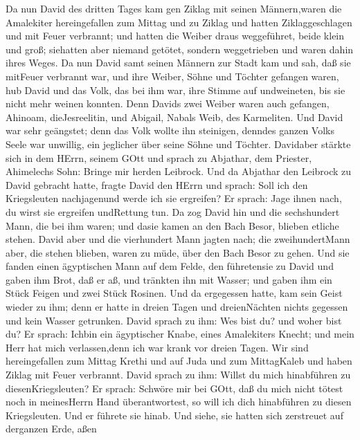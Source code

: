  Da nun David des dritten Tages kam gen Ziklag mit seinen
Männern,waren die Amalekiter hereingefallen zum Mittag und zu Ziklag und
hatten Ziklaggeschlagen und mit Feuer verbrannt;  und hatten
die Weiber draus weggeführet, beide klein und groß; siehatten aber
niemand getötet, sondern weggetrieben und waren dahin ihres Weges.
 Da nun David samt seinen Männern zur Stadt kam und sah, daß
sie mitFeuer verbrannt war, und ihre Weiber, Söhne und Töchter gefangen
waren,  hub David und das Volk, das bei ihm war, ihre Stimme
auf undweineten, bis sie nicht mehr weinen konnten.  Denn
Davids zwei Weiber waren auch gefangen, Ahinoam, dieJesreelitin, und
Abigail, Nabals Weib, des Karmeliten.  Und David war sehr
geängstet; denn das Volk wollte ihn steinigen, denndes ganzen Volks
Seele war unwillig, ein jeglicher über seine Söhne und Töchter.
Davidaber stärkte sich in dem HErrn, seinem GOtt  und sprach
zu Abjathar, dem Priester, Ahimelechs Sohn: Bringe mir herden Leibrock.
Und da Abjathar den Leibrock zu David gebracht hatte, 
fragte David den HErrn und sprach: Soll ich den Kriegsleuten
nachjagenund werde ich sie ergreifen? Er sprach: Jage ihnen nach, du
wirst sie ergreifen undRettung tun.  Da zog David hin und
die sechshundert Mann, die bei ihm waren; und dasie kamen an den Bach
Besor, blieben etliche stehen.  David aber und die
vierhundert Mann jagten nach; die zweihundertMann aber, die stehen
blieben, waren zu müde, über den Bach Besor zu gehen.  Und
sie fanden einen ägyptischen Mann auf dem Felde, den führetensie zu
David und gaben ihm Brot, daß er aß, und tränkten ihn mit Wasser;
 und gaben ihm ein Stück Feigen und zwei Stück Rosinen. Und
da ergegessen hatte, kam sein Geist wieder zu ihm; denn er hatte in
dreien Tagen und dreienNächten nichts gegessen und kein Wasser
getrunken.  David sprach zu ihm: Wes bist du? und woher
bist du? Er sprach: Ichbin ein ägyptischer Knabe, eines Amalekiters
Knecht; und mein Herr hat mich verlassen,denn ich war krank vor dreien
Tagen.  Wir sind hereingefallen zum Mittag Krethi und auf
Juda und zum MittagKaleb und haben Ziklag mit Feuer verbrannt.
 David sprach zu ihm: Willst du mich hinabführen zu
diesenKriegsleuten? Er sprach: Schwöre mir bei GOtt, daß du mich nicht
tötest noch in meinesHerrn Hand überantwortest, so will ich dich
hinabführen zu diesen Kriegsleuten.  Und er führete sie
hinab. Und siehe, sie hatten sich zerstreuet auf derganzen Erde, aßen
